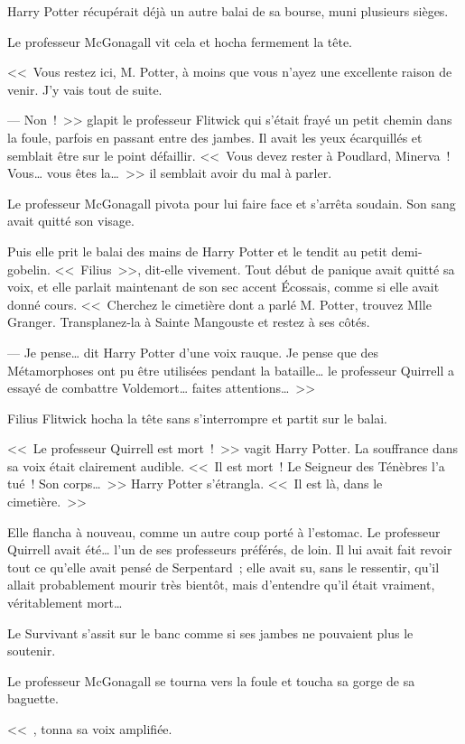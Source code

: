 Harry Potter récupérait déjà un autre balai de sa bourse, muni plusieurs sièges.

Le professeur McGonagall vit cela et hocha fermement la tête.

<<~Vous restez ici, M. Potter, à moins que vous n'ayez une excellente raison de venir. J'y vais tout de suite.

--- Non~!~>> glapit le professeur Flitwick qui s'était frayé un petit chemin dans la foule, parfois en passant entre des jambes. Il avait les yeux écarquillés et semblait être sur le point défaillir. <<~Vous devez rester à Poudlard, Minerva~! Vous… vous êtes la…~>> il semblait avoir du mal à parler.

Le professeur McGonagall pivota pour lui faire face et s'arrêta soudain. Son sang avait quitté son visage.

Puis elle prit le balai des mains de Harry Potter et le tendit au petit demi-gobelin. <<~Filius~>>, dit-elle vivement. Tout début de panique avait quitté sa voix, et elle parlait maintenant de son sec accent Écossais, comme si elle avait donné cours. <<~Cherchez le cimetière dont a parlé M. Potter, trouvez Mlle Granger. Transplanez-la à Sainte Mangouste et restez à ses côtés.

--- Je pense… dit Harry Potter d'une voix rauque. Je pense que des Métamorphoses ont pu être utilisées pendant la bataille… le professeur Quirrell a essayé de combattre Voldemort… faites attentions…~>>

Filius Flitwick hocha la tête sans s'interrompre et partit sur le balai.

<<~Le professeur Quirrell est mort~!~>> vagit Harry Potter. La souffrance dans sa voix était clairement audible. <<~Il est mort~! Le Seigneur des Ténèbres l'a tué~! Son corps…~>> Harry Potter s'étrangla. <<~Il est là, dans le cimetière.~>>

Elle flancha à nouveau, comme un autre coup porté à l'estomac. Le professeur Quirrell avait été… l'un de ses professeurs préférés, de loin. Il lui avait fait revoir tout ce qu'elle avait pensé de Serpentard~; elle avait su, sans le ressentir, qu'il allait probablement mourir très bientôt, mais d'entendre qu'il était vraiment, véritablement mort…

Le Survivant s'assit sur le banc comme si ses jambes ne pouvaient plus le soutenir.

Le professeur McGonagall se tourna vers la foule et toucha sa gorge de sa baguette.

<<~, tonna sa voix amplifiée. 

